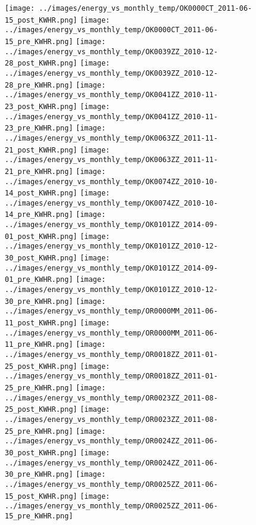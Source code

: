 \clearpage
\begin{figure}
\centering
\texttt{[image: ../images/energy\_vs\_monthly\_temp/OK0000CT\_2011-06-15\_post\_KWHR.png]}
\texttt{[image: ../images/energy\_vs\_monthly\_temp/OK0000CT\_2011-06-15\_pre\_KWHR.png]}
\texttt{[image: ../images/energy\_vs\_monthly\_temp/OK0039ZZ\_2010-12-28\_post\_KWHR.png]}
\texttt{[image: ../images/energy\_vs\_monthly\_temp/OK0039ZZ\_2010-12-28\_pre\_KWHR.png]}
\texttt{[image: ../images/energy\_vs\_monthly\_temp/OK0041ZZ\_2010-11-23\_post\_KWHR.png]}
\texttt{[image: ../images/energy\_vs\_monthly\_temp/OK0041ZZ\_2010-11-23\_pre\_KWHR.png]}
\texttt{[image: ../images/energy\_vs\_monthly\_temp/OK0063ZZ\_2011-11-21\_post\_KWHR.png]}
\texttt{[image: ../images/energy\_vs\_monthly\_temp/OK0063ZZ\_2011-11-21\_pre\_KWHR.png]}
\texttt{[image: ../images/energy\_vs\_monthly\_temp/OK0074ZZ\_2010-10-14\_post\_KWHR.png]}
\texttt{[image: ../images/energy\_vs\_monthly\_temp/OK0074ZZ\_2010-10-14\_pre\_KWHR.png]}
\texttt{[image: ../images/energy\_vs\_monthly\_temp/OK0101ZZ\_2014-09-01\_post\_KWHR.png]}
\texttt{[image: ../images/energy\_vs\_monthly\_temp/OK0101ZZ\_2010-12-30\_post\_KWHR.png]}
\texttt{[image: ../images/energy\_vs\_monthly\_temp/OK0101ZZ\_2014-09-01\_pre\_KWHR.png]}
\texttt{[image: ../images/energy\_vs\_monthly\_temp/OK0101ZZ\_2010-12-30\_pre\_KWHR.png]}
\texttt{[image: ../images/energy\_vs\_monthly\_temp/OR0000MM\_2011-06-11\_post\_KWHR.png]}
\texttt{[image: ../images/energy\_vs\_monthly\_temp/OR0000MM\_2011-06-11\_pre\_KWHR.png]}
\texttt{[image: ../images/energy\_vs\_monthly\_temp/OR0018ZZ\_2011-01-25\_post\_KWHR.png]}
\texttt{[image: ../images/energy\_vs\_monthly\_temp/OR0018ZZ\_2011-01-25\_pre\_KWHR.png]}
\texttt{[image: ../images/energy\_vs\_monthly\_temp/OR0023ZZ\_2011-08-25\_post\_KWHR.png]}
\texttt{[image: ../images/energy\_vs\_monthly\_temp/OR0023ZZ\_2011-08-25\_pre\_KWHR.png]}
\texttt{[image: ../images/energy\_vs\_monthly\_temp/OR0024ZZ\_2011-06-30\_post\_KWHR.png]}
\texttt{[image: ../images/energy\_vs\_monthly\_temp/OR0024ZZ\_2011-06-30\_pre\_KWHR.png]}
\texttt{[image: ../images/energy\_vs\_monthly\_temp/OR0025ZZ\_2011-06-15\_post\_KWHR.png]}
\texttt{[image: ../images/energy\_vs\_monthly\_temp/OR0025ZZ\_2011-06-15\_pre\_KWHR.png]}
\end{figure}
